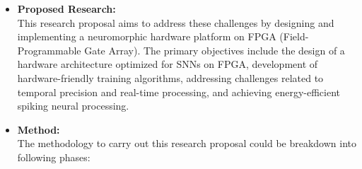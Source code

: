 \begin {itemize}
The objective of this research is to contribute to advancements in neuromorphic hardware, novel training algorithms, and dedicated hardware frameworks to help overcome some of the limitations associated with the implementation of neuromorphic systems.
\item [$\bullet$] { \bf Proposed Research:} \vspace{0.5em} \\
This research proposal aims to address these challenges by designing and implementing a neuromorphic hardware platform on FPGA (Field-Programmable Gate Array). The primary objectives include the design of a hardware architecture optimized for SNNs on FPGA, development of hardware-friendly training algorithms, addressing challenges related to temporal precision and real-time processing, and achieving energy-efficient spiking neural processing.
 \item [$\bullet$] { \bf Method:} \vspace{0.5em} \\
   The methodology to carry out this research proposal could be breakdown into following phases:
   \begin{itemize}
   

\end{itemize}
\end{itemize}
